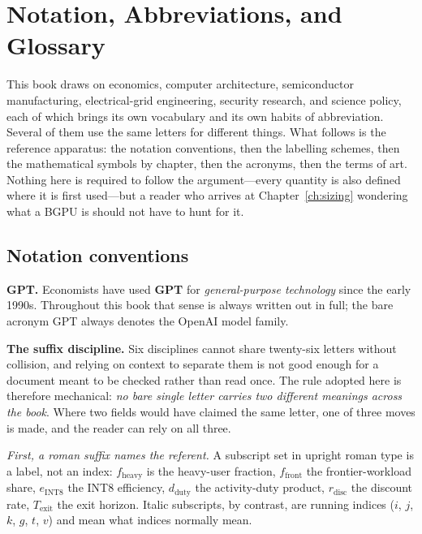 \chapter*{Notation, Abbreviations, and Glossary}

This book draws on economics, computer architecture, semiconductor manufacturing, electrical-grid engineering, security research, and science policy, each of which brings its own vocabulary and its own habits of abbreviation. Several of them use the same letters for different things. What follows is the reference apparatus: the notation conventions, then the labelling schemes, then the mathematical symbols by chapter, then the acronyms, then the terms of art. Nothing here is required to follow the argument---every quantity is also defined where it is first used---but a reader who arrives at Chapter~\ref{ch:sizing} wondering what a BGPU is should not have to hunt for it.

\section*{Notation conventions}

\textbf{GPT.} Economists have used \textbf{GPT} for \emph{general-purpose technology} since the early 1990s. Throughout this book that sense is always written out in full; the bare acronym GPT always denotes the OpenAI model family.

\textbf{The suffix discipline.} Six disciplines cannot share twenty-six letters without collision, and relying on context to separate them is not good enough for a document meant to be checked rather than read once. The rule adopted here is therefore mechanical: \emph{no bare single letter carries two different meanings across the book}. Where two fields would have claimed the same letter, one of three moves is made, and the reader can rely on all three.

\emph{First, a roman suffix names the referent.} A subscript set in upright roman type is a label, not an index: $f_{\mathrm{heavy}}$ is the heavy-user fraction, $f_{\mathrm{front}}$ the frontier-workload share, $e_{\mathrm{INT8}}$ the INT8 efficiency, $d_{\mathrm{duty}}$ the activity-duty product, $r_{\mathrm{disc}}$ the discount rate, $T_{\mathrm{exit}}$ the exit horizon. Italic subscripts, by contrast, are running indices ($i$, $j$, $k$, $g$, $t$, $v$) and mean what indices normally mean.

